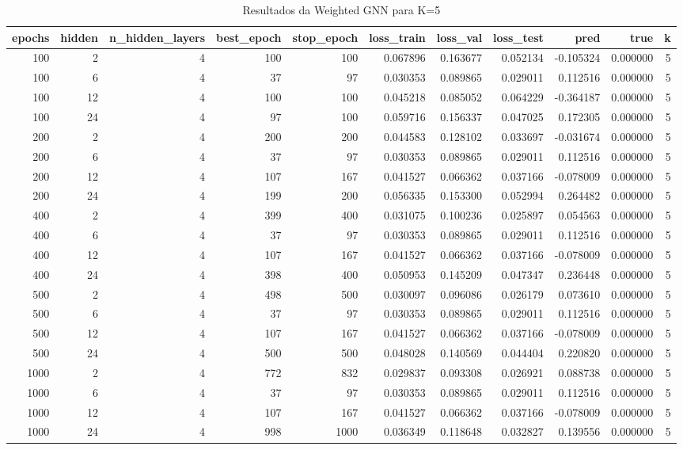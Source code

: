 \begin{table}
\caption{Resultados da Weighted GNN para K=5}
\label{tab:weighted_gnn_results_k5}
\begin{tabular}{rrrrrrrrrrr}
\toprule
epochs & hidden & n\_hidden\_layers & best\_epoch & stop\_epoch & loss\_train & loss\_val & loss\_test & pred & true & k \\
\midrule
100 & 2 & 4 & 100 & 100 & 0.067896 & 0.163677 & 0.052134 & -0.105324 & 0.000000 & 5 \\
100 & 6 & 4 & 37 & 97 & 0.030353 & 0.089865 & 0.029011 & 0.112516 & 0.000000 & 5 \\
100 & 12 & 4 & 100 & 100 & 0.045218 & 0.085052 & 0.064229 & -0.364187 & 0.000000 & 5 \\
100 & 24 & 4 & 97 & 100 & 0.059716 & 0.156337 & 0.047025 & 0.172305 & 0.000000 & 5 \\
200 & 2 & 4 & 200 & 200 & 0.044583 & 0.128102 & 0.033697 & -0.031674 & 0.000000 & 5 \\
200 & 6 & 4 & 37 & 97 & 0.030353 & 0.089865 & 0.029011 & 0.112516 & 0.000000 & 5 \\
200 & 12 & 4 & 107 & 167 & 0.041527 & 0.066362 & 0.037166 & -0.078009 & 0.000000 & 5 \\
200 & 24 & 4 & 199 & 200 & 0.056335 & 0.153300 & 0.052994 & 0.264482 & 0.000000 & 5 \\
400 & 2 & 4 & 399 & 400 & 0.031075 & 0.100236 & 0.025897 & 0.054563 & 0.000000 & 5 \\
400 & 6 & 4 & 37 & 97 & 0.030353 & 0.089865 & 0.029011 & 0.112516 & 0.000000 & 5 \\
400 & 12 & 4 & 107 & 167 & 0.041527 & 0.066362 & 0.037166 & -0.078009 & 0.000000 & 5 \\
400 & 24 & 4 & 398 & 400 & 0.050953 & 0.145209 & 0.047347 & 0.236448 & 0.000000 & 5 \\
500 & 2 & 4 & 498 & 500 & 0.030097 & 0.096086 & 0.026179 & 0.073610 & 0.000000 & 5 \\
500 & 6 & 4 & 37 & 97 & 0.030353 & 0.089865 & 0.029011 & 0.112516 & 0.000000 & 5 \\
500 & 12 & 4 & 107 & 167 & 0.041527 & 0.066362 & 0.037166 & -0.078009 & 0.000000 & 5 \\
500 & 24 & 4 & 500 & 500 & 0.048028 & 0.140569 & 0.044404 & 0.220820 & 0.000000 & 5 \\
1000 & 2 & 4 & 772 & 832 & 0.029837 & 0.093308 & 0.026921 & 0.088738 & 0.000000 & 5 \\
1000 & 6 & 4 & 37 & 97 & 0.030353 & 0.089865 & 0.029011 & 0.112516 & 0.000000 & 5 \\
1000 & 12 & 4 & 107 & 167 & 0.041527 & 0.066362 & 0.037166 & -0.078009 & 0.000000 & 5 \\
1000 & 24 & 4 & 998 & 1000 & 0.036349 & 0.118648 & 0.032827 & 0.139556 & 0.000000 & 5 \\
\bottomrule
\end{tabular}
\end{table}
